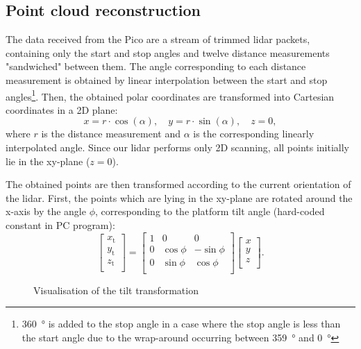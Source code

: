 \subsection{Point cloud reconstruction}
\label{subsec:point_cloud_reconstruction}
The data received from the Pico are a stream of trimmed \gls{lidar} packets, containing only the start and stop angles and twelve distance measurements "sandwiched" between them.
The angle corresponding to each distance measurement is obtained by linear interpolation between the start and stop angles\footnote{\SI{360}{\degree} is added to the stop angle in a case where the stop angle is less than the start angle due to the wrap-around occurring between \SI{359}{\degree} and \SI{0}{\degree}}.
Then, the obtained polar coordinates are transformed into Cartesian coordinates in a 2D plane:
\begin{equation}
    x = r \cdot \cos(\alpha), \quad y = r \cdot \sin(\alpha), \quad z = 0,
\end{equation}
where $r$ is the distance measurement and $\alpha$ is the corresponding linearly interpolated angle. Since our \gls{lidar} performs only 2D scanning, all points initially lie in the xy-plane ($z=0$).

The obtained points are then transformed according to the current orientation of the \gls{lidar}. First, the points which are lying in the xy-plane are rotated around the x-axis by the angle $\phi$, corresponding to the platform tilt angle (hard-coded constant in PC program):
\begin{equation}
\begin{bmatrix}
    x_{\text{t}} \\
    y_{\text{t}} \\
    z_{\text{t}} \\
\end{bmatrix}
=
\begin{bmatrix}
    1 & 0 & 0 \\
    0 & \cos \phi & -\sin \phi \\
    0 & \sin \phi & \cos \phi \\
\end{bmatrix}
\begin{bmatrix}
    x \\
    y \\
    z \\
\end{bmatrix}.
\end{equation}
\begin{figure}[H]
    \centering
    
    \caption{Visualisation of the tilt transformation}
\end{figure}

